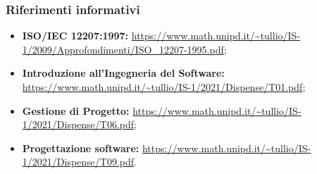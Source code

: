 \subsubsection{Riferimenti informativi}
\begin{itemize}
	\item \textbf{ISO/IEC 12207:1997:} \url{https://www.math.unipd.it/~tullio/IS-1/2009/Approfondimenti/ISO_12207-1995.pdf};
	\item \textbf{Introduzione all’Ingegneria del Software:} \url{https://www.math.unipd.it/~tullio/IS-1/2021/Dispense/T01.pdf};
	\item \textbf{Gestione di Progetto:} \url {https://www.math.unipd.it/~tullio/IS-1/2021/Dispense/T06.pdf};
	\item \textbf{Progettazione software:} \url{https://www.math.unipd.it/~tullio/IS-1/2021/Dispense/T09.pdf}.

\end{itemize}